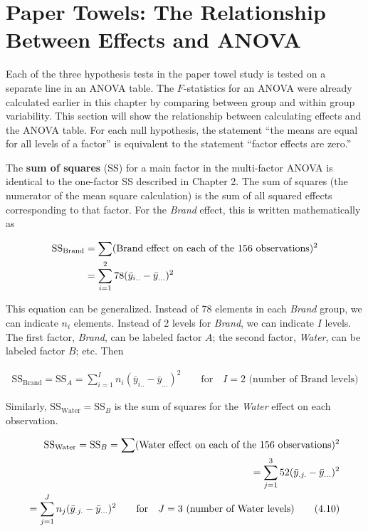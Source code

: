 \documentclass[
]{book}
\begin{document}
\hypertarget{paper-towels-the-relationship-between-effects-and-anova}{%
\section{Paper Towels: The Relationship Between Effects and ANOVA}\label{paper-towels-the-relationship-between-effects-and-anova}}

Each of the three hypothesis tests in the paper towel study is tested on a separate line in an ANOVA table. The \(F\)-statistics for an ANOVA were already calculated earlier in this chapter by comparing between group and within group variability. This section will show the relationship between calculating effects and the ANOVA table. For each null hypothesis, the statement ``the means are equal for all levels of a factor'' is equivalent to the statement ``factor effects are zero.''

The \textbf{sum of squares} (SS) for a main factor in the multi-factor ANOVA is identical to the one-factor SS described in Chapter 2. The sum of squares (the numerator of the mean square calculation) is the sum of all squared effects corresponding to that factor. For the \emph{Brand} effect, this is written mathematically as

\begin{align}
\text{SS}_{\text{Brand}} &= \sum (\text{Brand effect on each of the 156 observations})^2 \notag \\
&= \sum_{i=1}^{2} 78(\bar{y}_{i..} - \bar{y}_{...})^2
\notag
\end{align}

This equation can be generalized. Instead of 78 elements in each \emph{Brand} group, we can indicate \(n_i\) elements. Instead of 2 levels for \emph{Brand}, we can indicate \(I\) levels. The first factor, \emph{Brand}, can be labeled factor \(A\); the second factor, \emph{Water}, can be labeled factor \(B\); etc. Then

\begin{align}\label{4.9}
\text{SS}_{\text{Brand}} = \text{SS}_A = \sum_{i=1}^{I} n_i(\bar{y}_{i..} - \bar{y}_{...})^2 \qquad \text{for} \quad I=2 \text{ (number of Brand levels)}
\tag{4.9}
\end{align}

Similarly, \(\text{SS}_{\text{Water}} = \text{SS}_B\) is the sum of squares for the \emph{Water} effect on each observation.

\begin{align}\label{4.10}
\text{SS}_{\text{Water}} = \text{SS}_B = \sum (\text{Water effect on each of the 156 observations})^2 \notag \\
= \sum_{j=1}^{3} 52(\bar{y}_{.j.} - \bar{y}_{...})^2 \notag \\
= \sum_{j=1}^{J} n_j(\bar{y}_{.j.} - \bar{y}_{...})^2 \qquad \text{for} \quad J=3 \text{ (number of Water levels)}
\tag{4.10}
\end{align}
\end{document}
